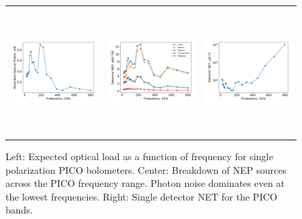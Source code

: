 \documentclass[]{spie}  %
\begin{document}
\begin{figure} [ht]
\begin{center}
\begin{tabular}{ccc} %
\hspace{-1.4cm} \includegraphics[height=4.9cm]{system_Popt.png} & \hspace{-0.7cm} \includegraphics[height=4.9cm]{system_NEP.png} &\hspace{-0.7cm}  \includegraphics[height=4.9cm]{system_NET.png} 
\end{tabular}
\end{center}
\caption{ \label{fig:popt} \label{fig:noise} \label{fig:net} 
Left: Expected optical load as a function of frequency for single polarization PICO bolometers. 
Center: Breakdown of NEP sources across the PICO frequency range.  Photon noise dominates even at the lowest frequencies. 
Right: Single detector NET for the PICO bands. 
}
\end{figure} 
\end{document}
